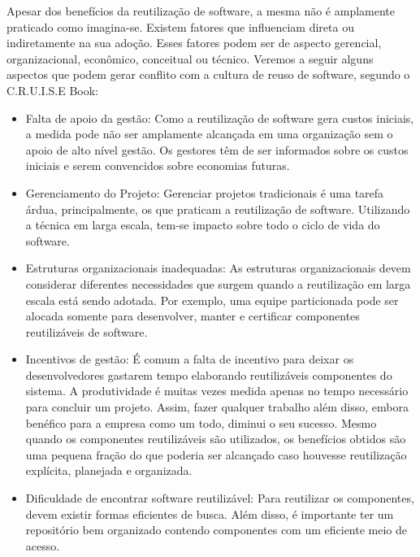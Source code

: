 Apesar dos benefícios da reutilização de software, a mesma não é amplamente praticado como imagina-se. Existem fatores que influenciam direta ou indiretamente na sua adoção. Esses fatores podem ser de aspecto gerencial, organizacional, econômico, conceitual ou técnico. Veremos a seguir alguns aspectos que podem gerar conflito com a cultura de reuso de software, segundo o C.R.U.I.S.E Book:

\begin{itemize}
	
\item Falta de apoio da gestão: Como a reutilização de software gera custos iniciais,
a medida pode não ser amplamente alcançada em uma organização sem o apoio de alto nível gestão. Os gestores têm de ser informados sobre os custos iniciais e serem convencidos sobre economias futuras.

\item Gerenciamento do Projeto: Gerenciar projetos tradicionais é uma tarefa árdua, principalmente, os que praticam a reutilização de software. Utilizando a técnica em larga escala, tem-se impacto sobre todo o ciclo de vida do software.

\item Estruturas organizacionais inadequadas: As estruturas organizacionais devem
considerar diferentes necessidades que surgem quando a reutilização em larga escala está sendo adotada. Por exemplo, uma equipe particionada pode ser alocada somente para desenvolver, manter e certificar componentes reutilizáveis de software.

\item Incentivos de gestão: É comum a falta de incentivo para deixar os desenvolvedores gastarem tempo elaborando reutilizáveis componentes do sistema. A produtividade é muitas vezes medida apenas no tempo necessário para concluir um projeto. Assim, fazer qualquer trabalho além disso, embora benéfico para a empresa como um todo, diminui o seu sucesso. Mesmo quando os componentes reutilizáveis são utilizados, os benefícios obtidos são uma pequena fração do que poderia ser alcançado caso houvesse reutilização explícita, planejada e organizada.

\item Dificuldade de encontrar software reutilizável: Para reutilizar os componentes, devem existir formas eficientes de busca. Além disso, é importante ter um repositório bem organizado contendo componentes com um eficiente meio de acesso.


\end{itemize}
